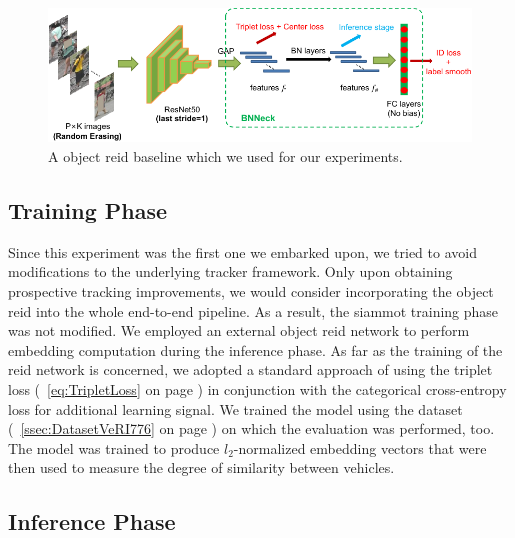 \begin{figure}[!t]
    \centering
    \includegraphics[width=\linewidth]{figures/siamese_tracking/bagoftricks_reid_architecture.pdf}
    \caption[\Gls{reid} baseline]{A object \gls{reid} baseline which we used for our experiments. }
    \label{fig:BagOfTricksReIDArchitecture}
\end{figure}

\subsection{Training Phase}

Since this experiment was the first one we embarked upon, we tried to avoid modifications to the underlying tracker framework. Only upon obtaining prospective tracking improvements, we would consider incorporating the object \gls{reid} into the whole end-to-end pipeline. As a result, the \gls{siammot} training phase was not modified. We employed an external object \gls{reid} network to perform embedding computation during the inference phase. As far as the training of the \gls{reid} network is concerned, we adopted a standard approach of using the triplet loss (\eqtext{}~\ref{eq:TripletLoss} on page \pageref{eq:TripletLoss}) in conjunction with the categorical cross-entropy loss for additional learning signal. We trained the model using the \verisss{} dataset (\sectiontext{}~\ref{ssec:DatasetVeRI776} on page \pageref{ssec:DatasetVeRI776}) on which the evaluation was performed, too. The model was trained to produce $l_2$-normalized embedding vectors that were then used to measure the degree of similarity between vehicles.

\subsection{Inference Phase}

